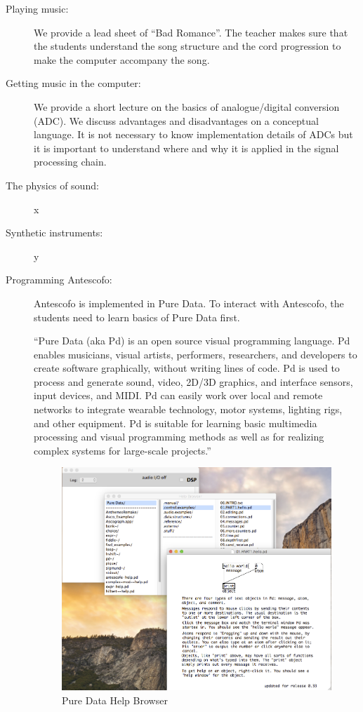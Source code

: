 \documentclass[onecolumn,nocopyrightspace,preprint]{sigplanconf}
\begin{document}
\begin{description}

\item[Playing music:] We provide a lead sheet of ``Bad Romance''. The teacher
makes sure that the students understand the song structure and the cord progression
to make the computer accompany the song. 

\item[Getting music in the computer:] We provide a short lecture on the basics
of analogue/digital conversion (ADC). We discuss advantages and disadvantages
on a conceptual language. It is not necessary to know implementation details
of ADCs but it is important to understand where and why it is applied in the
signal processing chain.

\item[The physics of sound:] x

\item[Synthetic instruments:] y

\item[Programming Antescofo:] Antescofo is implemented in Pure Data. To interact with
Antescofo, the students need to learn basics of Pure Data first.

``Pure Data (aka Pd) is an open source visual programming language. Pd enables
musicians, visual artists, performers, researchers, and developers to create
software graphically, without writing lines of code. Pd is used to process
and generate sound, video, 2D/3D graphics, and interface sensors, input
devices, and MIDI. Pd can easily work over local and remote networks to
integrate wearable technology, motor systems, lighting rigs, and other
equipment. Pd is suitable for learning basic multimedia processing and
visual programming methods as well as for realizing complex systems for
large-scale projects.''~\cite{website:puredata}

\begin{figure}[t]
    \centering
    \includegraphics[scale=0.4]{fig/pd-help-browser.png}
    \caption{Pure Data Help Browser}
    \label{fig:pd-help-browser}
\end{figure}


\end{description}
\end{document}
